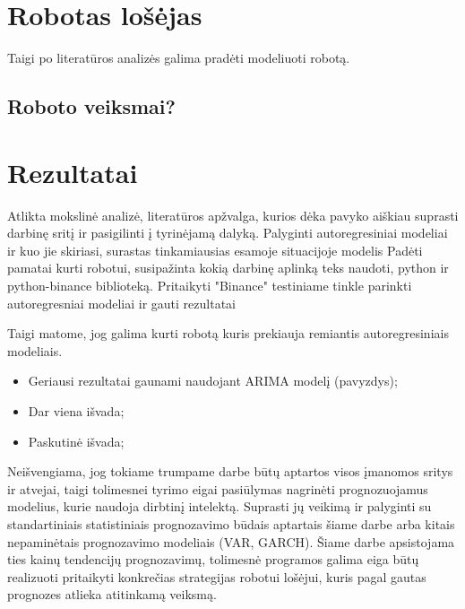 \documentclass{VUMIFInfKursinis}
\begin{document}
\section{Robotas lošėjas}
Taigi po literatūros analizės galima pradėti modeliuoti robotą.

\subsection{Roboto veiksmai?}


\section{Rezultatai}
Atlikta mokslinė analizė, literatūros apžvalga, kurios dėka pavyko aiškiau suprasti darbinę sritį ir pasigilinti į 
tyrinėjamą dalyką. 
Palyginti autoregresiniai modeliai ir kuo jie skiriasi, surastas tinkamiausias esamoje situacijoje modelis
Padėti pamatai kurti robotui, susipažinta kokią darbinę aplinką teks naudoti, python ir python-binance biblioteką.
Pritaikyti "Binance" testiniame tinkle parinkti autoregresniai modeliai ir gauti rezultatai

Taigi matome, jog galima kurti robotą kuris prekiauja remiantis autoregresiniais modeliais.
\begin{itemize}
  \item Geriausi rezultatai gaunami naudojant ARIMA modelį (pavyzdys);
  \item Dar viena išvada;
  \item Paskutinė išvada;
\end{itemize}
Neišvengiama, jog tokiame trumpame darbe būtų aptartos visos įmanomos sritys ir atvejai, taigi tolimesnei tyrimo eigai pasiūlymas nagrinėti prognozuojamus modelius, 
kurie naudoja dirbtinį intelektą. Suprasti jų veikimą ir palyginti su standartiniais statistiniais prognozavimo būdais aptartais šiame darbe arba kitais nepaminėtais
prognozavimo modeliais (VAR, GARCH). Šiame darbe apsistojama ties kainų tendencijų prognozavimų, tolimesnė programos galima eiga būtų realizuoti pritaikyti konkrečias strategijas 
robotui lošėjui, kuris pagal gautas prognozes atlieka atitinkamą veiksmą.
\end{document}

